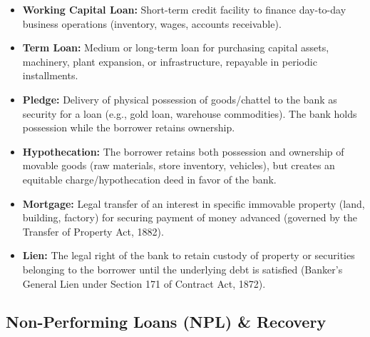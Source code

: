 \begin{itemize}
  \item \textbf{Working Capital Loan:} Short-term credit facility to finance day-to-day business operations (inventory, wages, accounts receivable).
  \item \textbf{Term Loan:} Medium or long-term loan for purchasing capital assets, machinery, plant expansion, or infrastructure, repayable in periodic installments.
  \item \textbf{Pledge:} Delivery of physical possession of goods/chattel to the bank as security for a loan (e.g., gold loan, warehouse commodities). The bank holds possession while the borrower retains ownership.
  \item \textbf{Hypothecation:} The borrower retains both possession and ownership of movable goods (raw materials, store inventory, vehicles), but creates an equitable charge/hypothecation deed in favor of the bank.
  \item \textbf{Mortgage:} Legal transfer of an interest in specific immovable property (land, building, factory) for securing payment of money advanced (governed by the Transfer of Property Act, 1882).
  \item \textbf{Lien:} The legal right of the bank to retain custody of property or securities belonging to the borrower until the underlying debt is satisfied (Banker's General Lien under Section 171 of Contract Act, 1872).
\end{itemize}

\medskip

\subsection{Non-Performing Loans (NPL) \& Recovery}

